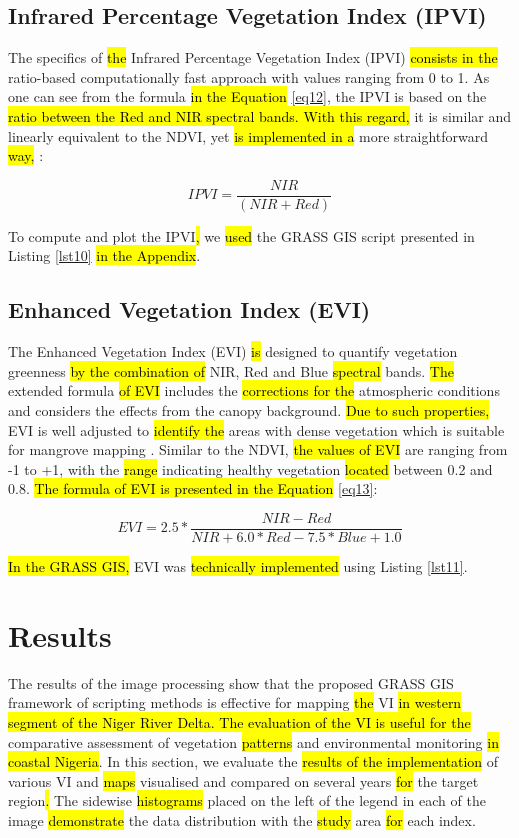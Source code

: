 \documentclass[jmse,article,submit,pdftex,moreauthors]{Definitions/mdpi}
\begin{document}
\subsection{Infrared Percentage Vegetation Index (IPVI)}

The specifics of \hl{the }Infrared Percentage Vegetation Index (IPVI) \hl{consists in the} ratio-based computationally fast approach with values ranging from 0 to 1. As one can see from the formula \hl{in the Equation }\ref{eq12}, the IPVI is based on the \hl{ratio between the Red and NIR spectral bands. With this regard, }it is similar and linearly equivalent to the NDVI, yet \hl{is implemented in a }more straightforward \hl{way, }\cite{CRIPPEN199071}:

\begin{equation}\label{eq12}
	IPVI = \frac{NIR}{(NIR+Red)}
\end{equation} 

To compute and plot the IPVI\hl{, }we \hl{used} the GRASS GIS script presented in Listing \ref{lst10}\hl{ in the Appendix}.

\subsection{Enhanced Vegetation Index (EVI)}

The Enhanced Vegetation Index (EVI) \hl{is} designed to quantify vegetation greenness \hl{by the combination of} NIR, Red and Blue \hl{spectral }bands. \hl{The} extended formula \hl{of EVI }includes the \hl{corrections for the }atmospheric conditions and considers the effects from the canopy background. \hl{Due to such properties,} EVI is well adjusted to \hl{identify the }areas with dense vegetation which is suitable for mangrove mapping \cite{HUETE2002195}.\hl{ }Similar to the NDVI, \hl{the values of EVI }are ranging from -1 to +1, with the \hl{range} indicating healthy vegetation \hl{located} between 0.2 and 0.8. \hl{The formula of EVI is presented in the Equation }\ref{eq13}:

\begin{equation}\label{eq13}
EVI = 2.5 * \frac{NIR - Red}{NIR + 6.0 * Red - 7.5 * Blue + 1.0}
\end{equation} 

\hl{In the GRASS GIS, }EVI was\hl{ technically implemented }using Listing \ref{lst11}.

\section{Results}
The results of the\hl{} image processing show that the proposed GRASS GIS framework of scripting methods is effective for mapping \hl{the }VI \hl{in western segment of the Niger River Delta. The evaluation of the VI is useful for the} comparative assessment of vegetation \hl{patterns }and environmental monitoring \hl{in coastal Nigeria}. In this section, we evaluate the \hl{results of the implementation} of various VI and \hl{maps} visualised and compared on several years \hl{for} the target region\hl{. }The sidewise \hl{histograms} placed on the left of the legend in each of the image \hl{demonstrate} the data distribution with the \hl{study }area\hl{ for }each index.
\end{document}
